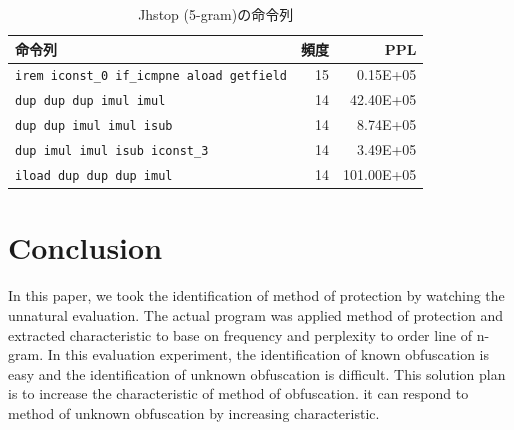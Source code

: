 \documentclass[conference]{IEEEtran}
\begin{document}
\begin{table}[t]
  \centering
  \footnotesize{
    \caption{Jhstop (5-gram)の命令列}\label{table:jhstop}
  \begin{tabular}{l|r|r}
   命令列 & 頻度 & PPL\\ \hline
    \texttt{irem iconst\_0 if\_icmpne aload getfield} & 15 &   0.15E+05 \\
    \texttt{dup dup dup imul imul}                    & 14 &  42.40E+05 \\
    \texttt{dup dup imul imul isub}                   & 14 &   8.74E+05 \\
    \texttt{dup imul imul isub iconst\_3}             & 14 &   3.49E+05 \\
    \texttt{iload dup dup dup imul}                   & 14 & 101.00E+05 \\
    \end{tabular}}
\end{table}


\section{Conclusion}
In this paper, we took the identification of method of protection by
watching the unnatural evaluation.  The actual program was applied
method of protection and extracted characteristic to base on frequency
and perplexity to order line of n-gram.  In this evaluation
experiment, the identification of known obfuscation is easy and the
identification of unknown obfuscation is difficult.  This solution
plan is to increase the characteristic of method of obfuscation.  it
can respond to method of unknown obfuscation by increasing
characteristic.





\end{document}
